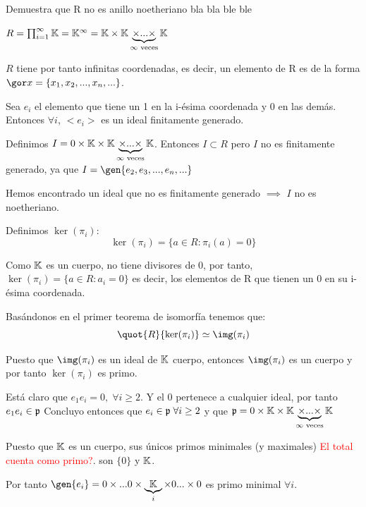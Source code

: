 \begin{problem}
	\ppart Demuestra que R no es anillo noetheriano
	\ppart bla bla
	\ppart ble ble
	\solution

	\spart
	$R=  \prod_{i=1}^{\infty} \mathbb{K} = \mathbb{K}^{\infty} = \mathbb{K} \times \mathbb{K} \underbrace{\times... \times}_{\infty \text{ veces}} \mathbb{K}$

	$R$ tiene por tanto infinitas coordenadas, es decir, un elemento de R es de la forma $\cls{x}=\{x_1,x_2,...,x_n,...\}$.

	Sea $e_i$ el elemento que tiene un 1 en la i-ésima coordenada y 0 en las demás. Entonces $\forall i$, $<e_i>$ es un ideal finitamente generado.

	Definimos $I=0 \times \mathbb{K} \times \mathbb{K} \underbrace{\times... \times}_{\infty \text{ veces}} \mathbb{K}$. Entonces $I \subset R$ pero $I$ no es finitamente generado, ya que $I = \gen{e_2,e_3,...,e_n,...}$

	Hemos encontrado un ideal que no es finitamente generado $\implies$ $I$ no es noetheriano.

	\spart

	Definimos $\ker(\pi_i)$:
	$$ \ker(\pi_i)=\{ a \in R: \pi_i(a)=0 \} $$

	Como $\mathbb{K}$ es un cuerpo, no tiene divisores de 0, por tanto, $\ker(\pi_i) = \{ a \in R: a_i=0 \}$ es decir, los elementos de R que tienen un 0 en su i-ésima coordenada.

	Basándonos en el primer teorema de isomorfía tenemos que:
	$$\quot{R}{\ker(\pi_i)} \simeq \img(\pi_i)$$


	Puesto que  $\img(\pi_i)$ es un ideal de $\mathbb{K}$ cuerpo, entonces $\img(\pi_i)$ es un cuerpo y por tanto $\ker(\pi_i)$ es primo.

	\spart
	Está claro que $e_1e_i = 0, \; \forall i \geq 2$. Y el 0 pertenece a cualquier ideal, por tanto $e_1e_i \in \mathfrak{p}$ Concluyo entonces que $e_i \in \mathfrak{p} \; \forall i \geq 2$ y que $\mathfrak{p} = 0 \times \mathbb{K} \times \mathbb{K} \underbrace{\times... \times}_{\infty \text{ veces}} \mathbb{K}$

	\spart Puesto que $\mathbb{K}$ es un cuerpo, sus únicos primos minimales (y maximales) \textcolor{red}{El total cuenta como primo?}. son $\{0\}$ y $\mathbb{K}$.

	Por tanto $\gen{e_i} = 0 \times ...0 \times \underbrace{\K}_{i} \times 0 ... \times 0 $ es primo minimal $\forall i$.
\end{problem}

